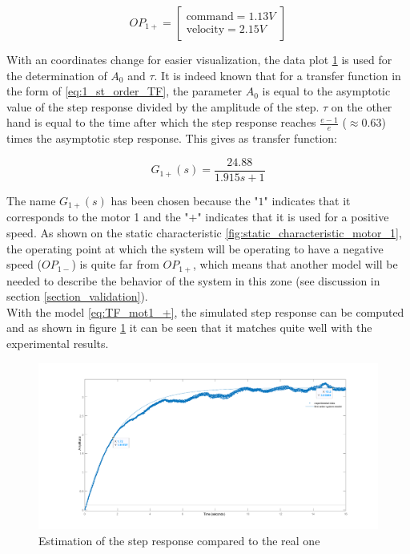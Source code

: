 \begin{equation}
    OP_{1+} = \begin{bmatrix}
        \text{command} = 1.13 V \\
        \text{velocity} = 2.15 V
    \end{bmatrix}
\end{equation}

With an coordinates change for easier visualization, the data plot \ref{fig:estimated_step_response_positive_motor_1} is 
used for the determination of $A_0$ and $\tau$. It is indeed known that for a transfer function in the form of 
\ref{eq:1_st_order_TF}, the parameter $A_0$ is equal to the asymptotic value of the step response divided by the amplitude 
of the step. $\tau$ on the other hand is equal to the time after which the step response reaches $\frac{e-1}{e}$ ($\approx 0.63$)
times the asymptotic step response. This gives as transfer function:

\begin{equation}
    G_{1+}(s) = \frac{24.88}{1.915s + 1}
    \label{eq:TF_mot1_+}
\end{equation}

The name $G_{1+}(s)$ has been chosen because the "\textit{$1$}" indicates that it corresponds to the motor 1 and the 
"\textit{$+$}" indicates that it is used for a positive speed. As shown on the static characteristic 
\ref{fig:static_characteristic_motor_1}, the operating point at which the system will be operating to have a negative speed 
($OP_{1-}$) is quite far from $OP_{1+}$, which means that another model will be needed to describe the behavior of the 
system in this zone (see discussion in section \ref{section_validation}).\\

With the model \ref{eq:TF_mot1_+}, the simulated step response can be computed and as shown in figure 
\ref{fig:estimated_step_response_positive_motor_1} it can be seen that it matches quite well with the experimental results.

\begin{figure}[H]
    \centering
    \includegraphics[height=\textheight/3]{Pictures/first_order_model_positive_motor_1.png}
    \caption{Estimation of the step response compared to the real one}
    \label{fig:estimated_step_response_positive_motor_1}
\end{figure}

